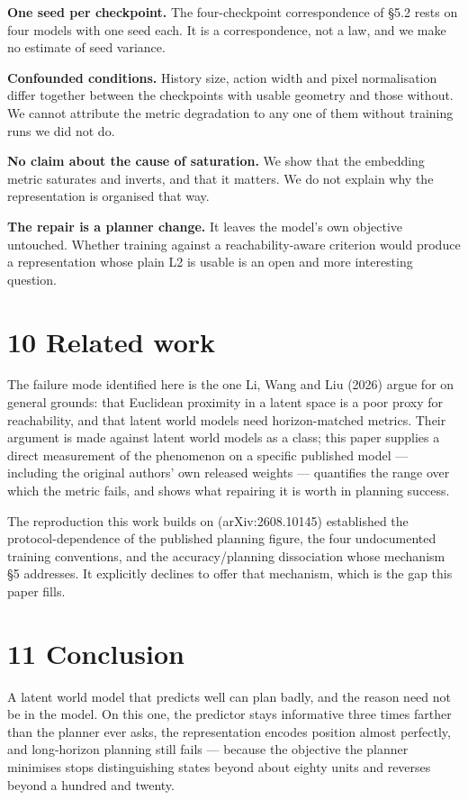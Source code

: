 \documentclass[10pt]{article}
\begin{document}
\textbf{One seed per checkpoint.} The four-checkpoint correspondence of \S{}5.2 rests
on four models with one seed each. It is a correspondence, not a law, and we
make no estimate of seed variance.

\textbf{Confounded conditions.} History size, action width and pixel normalisation
differ together between the checkpoints with usable geometry and those
without. We cannot attribute the metric degradation to any one of them
without training runs we did not do.

\textbf{No claim about the cause of saturation.} We show that the embedding metric
saturates and inverts, and that it matters. We do not explain why the
representation is organised that way.

\textbf{The repair is a planner change.} It leaves the model's own objective
untouched. Whether training against a reachability-aware criterion would
produce a representation whose plain L2 is usable is an open and more
interesting question.

\section{10 Related work}\label{related-work}

The failure mode identified here is the one Li, Wang and Liu (2026) argue for
on general grounds: that Euclidean proximity in a latent space is a poor
proxy for reachability, and that latent world models need horizon-matched
metrics. Their argument is made against latent world models as a class; this
paper supplies a direct measurement of the phenomenon on a specific published
model --- including the original authors' own released weights --- quantifies the
range over which the metric fails, and shows what repairing it is worth in
planning success.

The reproduction this work builds on (arXiv:2608.10145) established the
protocol-dependence of the published planning figure, the four undocumented
training conventions, and the accuracy/planning dissociation whose mechanism
\S{}5 addresses. It explicitly declines to offer that mechanism, which is the gap
this paper fills.

\section{11 Conclusion}\label{conclusion}

A latent world model that predicts well can plan badly, and the reason need
not be in the model. On this one, the predictor stays informative three times
farther than the planner ever asks, the representation encodes position
almost perfectly, and long-horizon planning still fails --- because the
objective the planner minimises stops distinguishing states beyond about
eighty units and reverses beyond a hundred and twenty.
\end{document}
